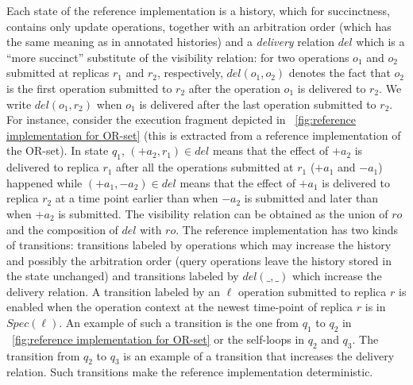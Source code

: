 Each state of the reference implementation is a history, which for succinctness, contains only update operations, together with an arbitration order (which has the same meaning as in annotated histories) and a \emph{delivery} relation $del$ which is a ``more succinct'' substitute of the visibility relation: for two operations $o_1$ and $o_2$ submitted at replicas $r_1$ and $r_2$, respectively, $del(o_1,o_2)$ denotes the fact that $o_2$ is the first operation submitted to $r_2$ after the operation $o_1$ is delivered to $r_2$. We write $del(o_1,r_2)$ when $o_1$ is delivered after the last operation submitted to $r_2$. For instance, consider the execution fragment depicted in \figurename~\ref{fig:reference implementation for OR-set} (this is extracted from a reference implementation of the OR-set). In state $q_1$, $(+a_2,r_1) \in \mathit{del}$ means that the effect of $+a_2$ is delivered to replica $r_1$ after all the operations submitted at $r_1$ ($+a_1$ and $-a_1$) happened while $(+a_1,-a_2) \in \mathit{del}$ means that the effect of $+a_1$ is delivered to replica $r_2$ at a time point earlier than when $-a_2$ is submitted and later than when $+a_2$ is submitted. The visibility relation can be obtained as the union of $\mathit{ro}$ and the composition of $\mathit{del}$ with $\mathit{ro}$. The reference implementation has two kinds of transitions: transitions labeled by operations which may increase the history and possibly the arbitration order (query operations leave the history stored in the state unchanged) and transitions labeled by $del(\_,\_)$ which increase the delivery relation. A transition labeled by an $\ell$ operation submitted to replica $r$ is enabled when the operation context at the newest time-point of replica $r$ is in $\mathit{Spec}(\ell)$. An example of such a transition is the one from $q_1$ to $q_2$ in \figurename~\ref{fig:reference implementation for OR-set} or the self-loops in $q_2$ and $q_3$. The transition from $q_2$ to $q_3$ is an example of a transition that increases the delivery relation. Such transitions make the reference implementation deterministic.

